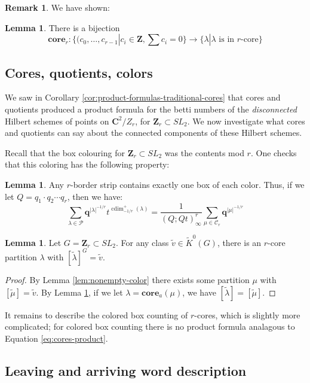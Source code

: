 \documentclass{amsart}[12pt]
\theoremstyle{definition}
\newtheorem{lemma}[dummy]{Lemma}
\newtheorem{remark}[dummy]{Remark}
\newcommand{\Z}{\mathbf{Z}}
\newcommand{\C}{\mathbf{C}}
\newcommand{\PP}{\mathcal{P}} %
\newcommand{\core}{\mathbf{core}}
\newcommand{\cores}{\mathcal{C}}
\DeclareMathOperator{\cdim}{cdim}
\begin{document}
\begin{remark}
We have shown:
\begin{lemma}
There is a bijection $$\core_r:\{(c_0,\dots,c_{r-1}|c_i\in\Z, \sum c_i=0\}\to \{\lambda | \lambda \text{ is in $r$-core} \}$$
\end{lemma}


\subsection{Cores, quotients, colors}

We saw in Corollary \ref{cor:product-formulas-traditional-cores} that cores and quotients produced a product formula for the betti numbers of the \emph{disconnected} Hilbert schemes of points on $\C^2/Z_r$, for $\Z_r\subset SL_2$.  We now investigate what cores and quotients can say about the connected components of these Hilbert schemes.

Recall that the box colouring for $\Z_r\subset SL_2$ was the contents mod $r$.  One checks that this coloring has the following property:
\begin{lemma} \label{lem:stripcolor}
Any $r$-border strip contains exactly one box of each color.  Thus, if we let $Q=q_1\cdot q_2\cdots q_r$, then we have:
  $$\sum_{\lambda\in\PP} \mathbf{q}^{|\lambda|^{-1/r}} t^{\cdim^+_{-1/r}(\lambda)}=\frac{1}{(Q;Qt)^r_\infty}\sum_{\mu\in\cores_r} \mathbf{q}^{|\mu|^{-1/r}}$$
\end{lemma}


\begin{lemma} \label{lem:colored-core-existence}
Let $G=\Z_r\subset SL_2$.    For any class $\widetilde{v}\in \widetilde{K}^0(G)$, there is an $r$-core partition $\lambda$ with $[\widetilde{\lambda}]^G=\widetilde{v}$.
\end{lemma}

\begin{proof}
By Lemma \ref{lem:nonempty-color} there exists some partition $\mu$ with $[\widetilde{\mu}]=\widetilde{v}$.  By Lemma \ref{lem:stripcolor}, if we let $\lambda=\core_a(\mu)$, we have $[\widetilde{\lambda}]=[\widetilde{\mu}]$.
\end{proof}

It remains to describe the colored box counting of $r$-cores, which is slightly more complicated; for colored box counting there is no product formula analagous to Equation \eqref{eq:cores-product}.

\subsection{Leaving and arriving word description}








\end{remark}
\end{document}
